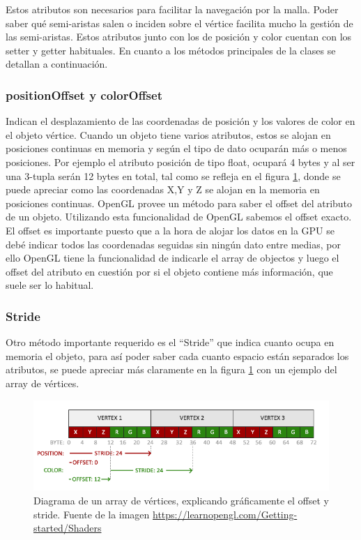 Estos atributos son necesarios para facilitar la navegación por la malla. Poder saber qué semi-aristas salen o inciden sobre el vértice facilita mucho la gestión de las semi-aristas. Estos atributos junto con los de posición y color cuentan con los setter y getter habituales. En cuanto a los métodos principales de la clases se detallan a continuación.\\

\subsubsection*{positionOffset y colorOffset}
Indican el desplazamiento de las coordenadas de posición  y los valores de color en el objeto vértice. Cuando un objeto tiene varios atributos, estos se alojan en posiciones continuas en memoria y según el tipo de dato ocuparán más o menos posiciones. Por ejemplo el atributo posición de tipo float, ocupará 4 bytes y al ser una 3-tupla serán 12 bytes en total, tal como se refleja en el figura \ref{fig:vertex_attribute_pointer_interleaved.png}, donde se puede apreciar como las coordenadas X,Y y Z se alojan en la memoria en posiciones continuas. OpenGL provee un método para saber el offset del atributo de un objeto. Utilizando esta funcionalidad de OpenGL sabemos el offset exacto. El offset es importante  puesto que a la hora de alojar los datos en la GPU se debé indicar todos las coordenadas seguidas sin ningún dato entre medias, por ello OpenGL tiene la funcionalidad de indicarle el array de objectos y luego el offset del atributo en cuestión por si el objeto contiene más información, que suele ser lo habitual.\\

\subsubsection*{Stride}

Otro método importante requerido es el ``Stride'' que indica cuanto ocupa en memoria el objeto, para así poder saber cada cuanto espacio están separados los atributos, se puede apreciar más claramente en la figura \ref{fig:vertex_attribute_pointer_interleaved.png} con un ejemplo del array de vértices.


\begin{figure} %
	\centering
	\includegraphics[scale=0.6]{imagenes/vertex_attribute_pointer_interleaved.png} 
	\caption{ Diagrama de un array de vértices, explicando gráficamente el offset y stride. Fuente de la imagen \url{https://learnopengl.com/Getting-started/Shaders}} \label{fig:vertex_attribute_pointer_interleaved.png}
\end{figure}



